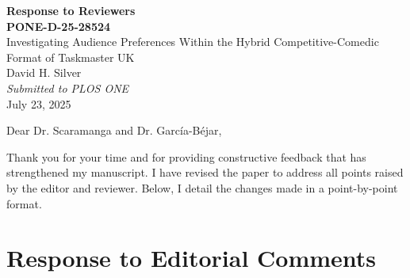 \documentclass[11pt]{article}
\begin{document}
\begin{center}
{\Large \textbf{Response to Reviewers}}\\
\vspace{0.3cm}
{\large \textbf{PONE-D-25-28524}}\\
{\large Investigating Audience Preferences Within the Hybrid Competitive-Comedic Format of Taskmaster UK}\\
\vspace{0.3cm}
David H. Silver\\
\textit{Submitted to PLOS ONE}\\
\vspace{0.3cm}
July 23, 2025
\end{center}

\vspace{0.5cm}

Dear Dr. Scaramanga and Dr. García-Béjar,

Thank you for your time and for providing constructive feedback that has strengthened my manuscript. I have revised the paper to address all points raised by the editor and reviewer. Below, I detail the changes made in a point-by-point format.

\vspace{0.5cm}

\section*{Response to Editorial Comments}
\end{document}
